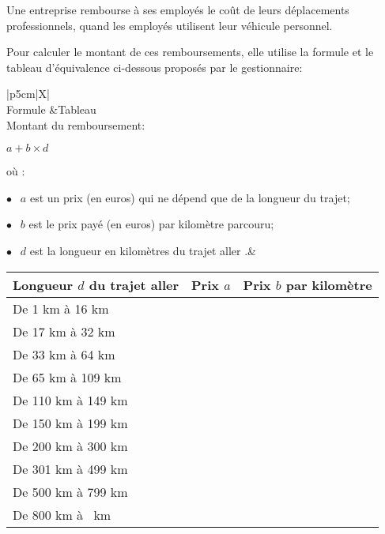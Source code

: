 
\medskip

Une entreprise rembourse à ses employés le coût de leurs déplacements professionnels, quand les employés utilisent leur véhicule personnel.

Pour calculer le montant de ces remboursements, elle utilise la formule et le tableau d'équivalence ci-dessous proposés par le gestionnaire:

\begin{center}
\begin{tabularx}{\linewidth}{|p{5cm}|X|}\hline
{}\\
Formule 		&Tableau\\
Montant du remboursement:

\qquad $a + b\times d$

où :

$\bullet~~$ $a$ est un prix (en euros) qui ne dépend que de la longueur du trajet;

$\bullet~~$ $b$ est le prix payé (en euros) par kilomètre parcouru;

$\bullet~~$ $d$ est la longueur en kilomètres du \og trajet aller \fg.&
\begin{tabular}{|m{3cm}|c| c|}\hline
Longueur $d$ du \og trajet aller\fg	&Prix $a$&Prix $b$ par kilomètre\\ \hline
 De 1 km à 16 km						&\np{0,7781}		&\np{0,1944}\\ \hline
 De 17 km à 32 km 						&\np{0,2503}		&\np{0,2165}\\ \hline
 De 33 km à 64 km 						&\np{2,0706}		&\np{0,1597}\\ \hline
 De 65 km à 109 km 						&\np{2,8891}		&\np{0,1489}\\ \hline
 De 110 km à 149 km 					&\np{4,0864}		&\np{0,1425}\\ \hline
 De 150 km à 199 km 					&\np{8,0871}		&\np{0,1193}\\ \hline
 De 200 km à 300 km 					&\np{7,7577}		&\np{0,1209}\\ \hline
 De 301 km à 499 km 					&\np{13,6514}	&\np{0,1030}\\ \hline
 De 500 km à 799 km 					&\np{18,4449}	&\np{0,0921}\\ \hline
 De 800 km à \np{9999}~km				&\np{32,2041}	&\np{0,0755}\\ \hline
\end{tabular} \\ \hline
\end{tabularx}
\end{center}
\medskip

